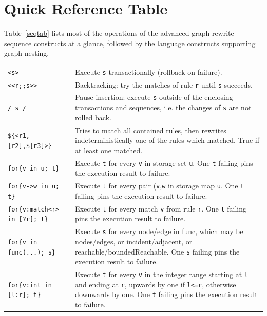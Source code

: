 \section{Quick Reference Table}

Table~\ref{seqtab} lists most of the operations of the advanced graph rewrite sequence constructs at a glance, followed by the language constructs supporting graph nesting.

\begin{table}[htbp]
\begin{minipage}{\linewidth} \renewcommand{\footnoterule}{} 
\begin{tabularx}{\linewidth}{|lX|}
\hline
\texttt{<s>}	& Execute \texttt{s} transactionally (rollback on failure).\\
\texttt{<<r;;s>>}	& Backtracking: try the matches of rule \texttt{r} until \texttt{s} succeeds.\\
\texttt{/ s /}	& Pause insertion: execute \texttt{s} outside of the enclosing transactions and sequences, i.e. the changes of \texttt{s} are not rolled back.\\
\hline
\texttt{\$\{<r1,[r2],\$[r3]>\}}	& Tries to match all contained rules, then rewrites indeterministically one of the rules which matched. True if at least one matched.\\
\hline
\texttt{for\{v in u; t\}}	& Execute \texttt{t} for every \texttt{v} in storage set \texttt{u}. One \texttt{t} failing pins the execution result to failure.\\
\texttt{for\{v->w in u; t\}}	& Execute \texttt{t} for every pair (\texttt{v},\texttt{w} in storage map \texttt{u}. One \texttt{t} failing pins the execution result to failure.\\
\texttt{for\{v:match<r> in [?r]; t\}}	& Execute \texttt{t} for every match \texttt{v} from rule \texttt{r}. One \texttt{t} failing pins the execution result to failure.\\
\texttt{for\{v in func(...); s\}}	& Execute \texttt{s} for every node/edge in func, which may be nodes/edges, or incident/adjacent, or reachable/boundedReachable. One \texttt{s} failing pins the execution result to failure.\\
\texttt{for\{v:int in [l:r]; t\}}	& Execute \texttt{t} for every \texttt{v} in the integer range starting at \texttt{l} and ending at \texttt{r}, upwards by one if \texttt{l<=r}, otherwise downwards by one. One \texttt{t} failing pins the execution result to failure.\\

\end{tabularx}
\end{minipage}
\end{table}
